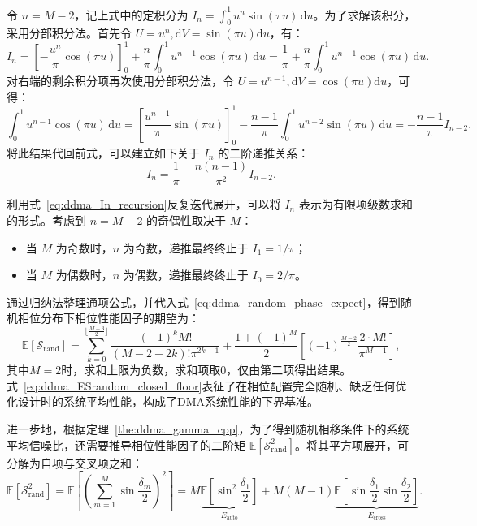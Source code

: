 令 $n = M-2$，记上式中的定积分为 $I_n = \int_0^1 u^n \sin(\pi u) \, \mathrm{d}u$。为了求解该积分，采用分部积分法。首先令 $U=u^n, \mathrm{d}V=\sin(\pi u)\mathrm{d}u$，有：
\begin{equation}
	I_n = \left[ -\frac{u^n}{\pi}\cos(\pi u) \right]_0^1 + \frac{n}{\pi} \int_0^1 u^{n-1} \cos(\pi u) \, \mathrm{d}u = \frac{1}{\pi} + \frac{n}{\pi} \int_0^1 u^{n-1} \cos(\pi u) \, \mathrm{d}u.
\end{equation}
对右端的剩余积分项再次使用分部积分法，令 $U=u^{n-1}, \mathrm{d}V=\cos(\pi u)\mathrm{d}u$，可得：
\begin{equation}
	\int_0^1 u^{n-1} \cos(\pi u) \, \mathrm{d}u = \left[ \frac{u^{n-1}}{\pi}\sin(\pi u) \right]_0^1 - \frac{n-1}{\pi} \int_0^1 u^{n-2} \sin(\pi u) \, \mathrm{d}u = - \frac{n-1}{\pi} I_{n-2}.
\end{equation}
将此结果代回前式，可以建立如下关于 $I_n$ 的二阶递推关系：
\begin{equation}\label{eq:ddma_In_recursion}
	I_n = \frac{1}{\pi} - \frac{n(n-1)}{\pi^2} I_{n-2}.
\end{equation}


利用式~\eqref{eq:ddma_In_recursion}反复迭代展开，可以将 $I_n$ 表示为有限项级数求和的形式。考虑到 $n=M-2$ 的奇偶性取决于 $M$：
\begin{itemize}
	\item 当 $M$ 为奇数时，$n$ 为奇数，递推最终终止于 $I_1 = 1/\pi$；
	\item 当 $M$ 为偶数时，$n$ 为偶数，递推最终终止于 $I_0 = 2/\pi$。
\end{itemize}
通过归纳法整理通项公式，并代入式~\eqref{eq:ddma_random_phase_expect}，得到随机相位分布下相位性能因子的期望为：
\begin{equation}\label{eq:ddma_ESrandom_closed_floor}
	\mathbb{E}[\mathcal{S}_{\text{rand}}] = \sum_{k=0}^{\lfloor \frac{M-3}{2} \rfloor} \frac{(-1)^k M!}{(M-2-2k)! \pi^{2k+1}} + \frac{1+(-1)^M}{2} \left[ (-1)^{\frac{M-2}{2}} \frac{2 \cdot M!}{\pi^{M-1}} \right],
\end{equation}
其中$M=2$时，求和上限为负数，求和项取0，仅由第二项得出结果。式~\eqref{eq:ddma_ESrandom_closed_floor}表征了在相位配置完全随机、缺乏任何优化设计时的系统平均性能，构成了DMA系统性能的下界基准。

进一步地，根据定理~\ref{the:ddma_gamma_cpp}，为了得到随机相移条件下的系统平均信噪比，还需要推导相位性能因子的二阶矩 $\mathbb{E}[\mathcal{S}_{\text{rand}}^2]$。将其平方项展开，可分解为自项与交叉项之和：
\begin{equation}
	\mathbb{E}[\mathcal{S}_{\text{rand}}^2] = \mathbb{E}\left[ \left( \sum_{m=1}^M \sin\frac{\delta_m}{2} \right)^2 \right] 
	= M \underbrace{\mathbb{E}\left[\sin^2\frac{\delta_1}{2}\right]}_{E_{\text{auto}}} + M(M-1) \underbrace{\mathbb{E}\left[\sin\frac{\delta_1}{2} \sin\frac{\delta_2}{2}\right]}_{E_{\text{cross}}}.
\end{equation}


